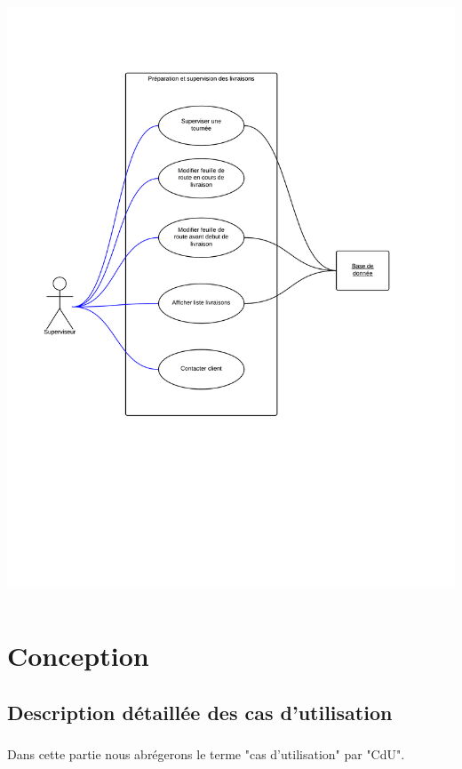\documentclass[a4paper]{report}
\begin{document}
\includegraphics[width=15cm, height=18cm]{images/DiagrammeCdU}

\chapter{Conception}

\section{Description détaillée des cas d'utilisation}

\paragraph{}

Dans cette partie nous abrégerons le terme "cas d'utilisation" par "CdU". \\
\end{document}
